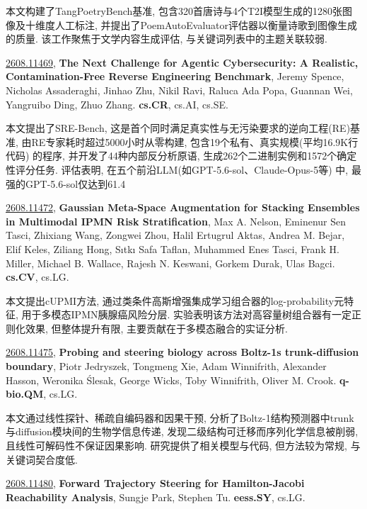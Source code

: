\documentclass[9pt, a4paper]{article}
\theoremstyle{plain}
\theoremstyle{definition}
\theoremstyle{remark}
\newcommand{\arxivwithtarget}[3]{\hypertarget{#1}{}\href{https://arxiv.org/abs/#1}{#1}, \textbf{\textcolor{arxivblue}{#2}}, #3. }
\begin{document}
本文构建了TangPoetryBench基准, 包含320首唐诗与4个T2I模型生成的1280张图像及十维度人工标注, 并提出了PoemAutoEvaluator评估器以衡量诗歌到图像生成的质量. 该工作聚焦于文学内容生成评估, 与关键词列表中的主题关联较弱.


\arxivwithtarget{2608.11469}{The Next Challenge for Agentic Cybersecurity: A Realistic, Contamination-Free Reverse Engineering Benchmark}{Jeremy Spence, Nicholas Assaderaghi, Jinhao Zhu, Nikil Ravi, Raluca Ada Popa, Guannan Wei, Yangruibo Ding, Zhuo Zhang}\textbf{cs.CR}, cs.AI, cs.SE.

本文提出了SRE-Bench, 这是首个同时满足真实性与无污染要求的逆向工程(RE)基准, 由RE专家耗时超过5000小时从零构建, 包含19个私有、真实规模(平均16.9K行代码) 的程序, 并开发了44种内部反分析原语, 生成262个二进制实例和1572个确定性评分任务. 评估表明, 在五个前沿LLM(如GPT-5.6-sol、Claude-Opus-5等) 中, 最强的GPT-5.6-sol仅达到61.4%


\arxivwithtarget{2608.11472}{Gaussian Meta-Space Augmentation for Stacking Ensembles in Multimodal IPMN Risk Stratification}{Max A. Nelson, Eminenur Sen Tasci, Zhixiang Wang, Zongwei Zhou, Halil Ertugrul Aktas, Andrea M. Bejar, Elif Keles, Ziliang Hong, Sıtkı Safa Taflan, Muhammed Enes Tasci, Frank H. Miller, Michael B. Wallace, Rajesh N. Keswani, Gorkem Durak, Ulas Bagci}\textbf{cs.CV}, cs.LG.

本文提出cUPMI方法, 通过类条件高斯增强集成学习组合器的log-probability元特征, 用于多模态IPMN胰腺癌风险分层. 实验表明该方法对高容量树组合器有一定正则化效果, 但整体提升有限, 主要贡献在于多模态融合的实证分析.


\arxivwithtarget{2608.11475}{Probing and steering biology across Boltz-1s trunk-diffusion boundary}{Piotr Jedryszek, Tongmeng Xie, Adam Winnifrith, Alexander Hasson, Weronika Ślesak, George Wicks, Toby Winnifrith, Oliver M. Crook}\textbf{q-bio.QM}, cs.LG.

本文通过线性探针、稀疏自编码器和因果干预, 分析了Boltz-1结构预测器中trunk与diffusion模块间的生物学信息传递, 发现二级结构可迁移而序列化学信息被削弱, 且线性可解码性不保证因果影响. 研究提供了相关模型与代码, 但方法较为常规, 与关键词契合度低.


\arxivwithtarget{2608.11480}{Forward Trajectory Steering for Hamilton-Jacobi Reachability Analysis}{Sungje Park, Stephen Tu}\textbf{eess.SY}, cs.LG.
\end{document}

